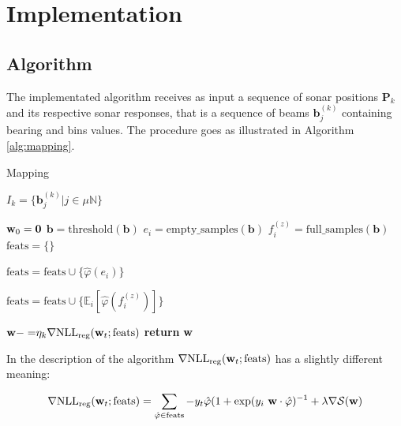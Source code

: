 \section{Implementation}
\subsection{Algorithm}

The implementated algorithm receives as input a sequence of sonar positions
$\mathbf{P}_k$ and its respective sonar responses, that is a sequence of beams
$\mathbf{b}_j^{(k)}$ containing bearing and bins values. The procedure goes
as illustrated in Algorithm \ref{alg:mapping}.


\begin{algorithm}
\caption{Mapping}
\label{alg:mapping}
\begin{algorithmic}

\State $I_k = \{\mathbf{b}_j^{(k)}|j\in \mu\mathbb{N}\}$

\State $\mathrm{\mathbf{w}}_0 = \mathbf{0}$
\State $\mathbf{b} = \mathrm{threshold}(\mathbf{b})$
\State $e_i = \mathrm{empty\_samples}(\mathbf{b})$
\State $f_i^{(z)} = \mathrm{full\_samples}(\mathbf{b})$
\State $\text{feats}=\{\}$

\State $\text{feats}=\text{feats}\cup\{\hat\varphi(e_i)\}$
\EndFor

\State
$\text{feats}=\text{feats}\cup\{\mathbb{E}_i[{
\hat\varphi(f_i^{(z)})}]\}$
\EndFor
\EndFor

\State $\mathrm{\mathbf{w}} {-=}
\eta_k\nabla\text{NLL}_{\text{reg}}(\mathrm{\mathbf{w}}_t;\text{feats})$ 
\EndFor
\State \textbf{return} $\mathrm{\mathbf{w}}$
\EndProcedure
\end{algorithmic}
\end{algorithm}

In the description of the algorithm
$\nabla\text{NLL}_{\text{reg}}(\mathrm{\mathbf{w}}_t;\text{feats})$ has a slightly
different meaning:

\begin{equation*}
\nabla\text{NLL}_{\text{reg}}(\mathrm{\mathbf{w}}_t;\text{feats}) =
\sum_{\hat{\mathbf{\varphi}}\in \text{feats}}
-y_t\hat{\mathbf{\varphi}}(1+\exp(y_i~ \mathrm{\mathbf{w}}\cdot\hat{\mathbf{\varphi}})^{-1} +\lambda\nabla\mathcal{S}(\mathrm{\mathbf{w}})
\end{equation*}


